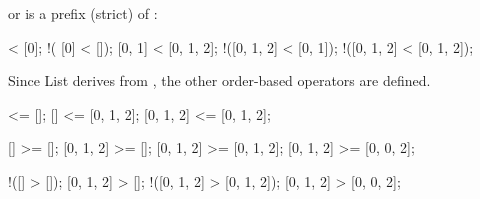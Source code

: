 \begin{urbiscriptapi}
  \noindent
  or \that is a prefix (strict) of \this:

\begin{urbiassert}
           [] < [0];          !(      [0] < []);
       [0, 1] < [0, 1, 2];    !([0, 1, 2] < [0, 1]);
  !([0, 1, 2] < [0, 1, 2]);
\end{urbiassert}

  Since List derives from , the other order-based
  operators are defined.

\begin{urbiassert}
        [] <= [];
        [] <= [0, 1, 2];
 [0, 1, 2] <= [0, 1, 2];

        [] >= [];
 [0, 1, 2] >= [];
 [0, 1, 2] >= [0, 1, 2];
 [0, 1, 2] >= [0, 0, 2];

       !([] > []);
  [0, 1, 2] > [];
!([0, 1, 2] > [0, 1, 2]);
  [0, 1, 2] > [0, 0, 2];
\end{urbiassert}
\end{urbiscriptapi}

